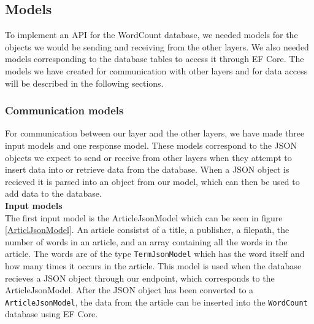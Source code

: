 \subsection{Models}
To implement an API for the WordCount database, we needed models for the objects we would be sending and receiving from the other layers. 
We also needed models corresponding to the database tables to access it through EF Core. The models we have created for communication with other layers and for data access will be described in the following sections.

\subsubsection*{Communication models}
For communication between our layer and the other layers, we have made three input models and one response model. 
These models correspond to the JSON objects we expect to send or receive from other layers when they attempt to insert data into or retrieve data from the database. 
When a JSON object is recieved it is parsed into an object from our model, which can then be used to add data to the database.
\\

\textbf{Input models}\\
The first input model is the ArticleJsonModel which can be seen in figure \ref{ArticlJsonModel}. An article consistst of a title, a publisher, a filepath, the number of words in an article, and an array containing all the words in the article. 
The words are of the type \texttt{TermJsonModel} which has the word itself and how many times it occurs in the article.
This model is used when the database recieves a JSON object through our endpoint, which corresponds to the ArticleJsonModel. 
After the JSON object has been converted to a \texttt{ArticleJsonModel}, the data from the article can be inserted into the \texttt{WordCount} database using EF Core.


